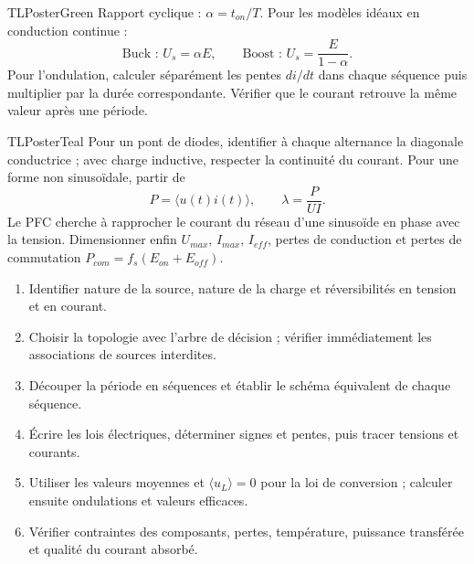 \documentclass[10pt,a3paper]{article}
\begin{document}
\begin{minipage}[t]{0.49\linewidth}
\begin{TLPosterBloc}{TLPosterGreen}
Rapport cyclique : $\alpha=t_{on}/T$. Pour les modèles idéaux en conduction continue :
\[
\text{Buck : }U_s=\alpha E,\qquad
\text{Boost : }U_s=\frac{E}{1-\alpha}.
\]
Pour l'ondulation, calculer séparément les pentes $di/dt$ dans chaque séquence puis multiplier par la durée correspondante. Vérifier que le courant retrouve la même valeur après une période.
\end{TLPosterBloc}
\begin{TLPosterBloc}{TLPosterTeal}
Pour un pont de diodes, identifier à chaque alternance la diagonale conductrice ; avec charge inductive, respecter la continuité du courant. Pour une forme non sinusoïdale, partir de
\[
P=\langle u(t)i(t)\rangle,\qquad \lambda=\frac{P}{UI}.
\]
Le PFC cherche à rapprocher le courant du réseau d'une sinusoïde en phase avec la tension. Dimensionner enfin $U_{max}$, $I_{max}$, $I_{eff}$, pertes de conduction et pertes de commutation $P_{com}=f_s(E_{on}+E_{off})$.
\end{TLPosterBloc}
\end{minipage}
\vfill
\begin{TLPosterMethode}
\begin{enumerate}
  \item Identifier nature de la source, nature de la charge et réversibilités en tension et en courant.
  \item Choisir la topologie avec l'arbre de décision ; vérifier immédiatement les associations de sources interdites.
  \item Découper la période en séquences et établir le schéma équivalent de chaque séquence.
  \item Écrire les lois électriques, déterminer signes et pentes, puis tracer tensions et courants.
  \item Utiliser les valeurs moyennes et $\langle u_L\rangle=0$ pour la loi de conversion ; calculer ensuite ondulations et valeurs efficaces.
  \item Vérifier contraintes des composants, pertes, température, puissance transférée et qualité du courant absorbé.
\end{enumerate}
\end{TLPosterMethode}
\vfill
{}
\end{document}
